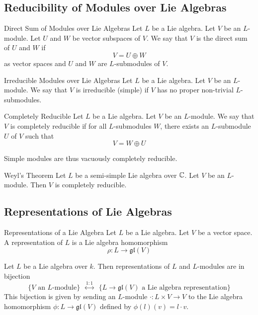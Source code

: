 \documentclass[a4paper]{article}
\begin{document}
\subsection{Reducibility of Modules over Lie Algebras}
\begin{defn}{Direct Sum of Modules over Lie Algebras}{} Let $L$ be a Lie algebra. Let $V$ be an $L$-module. Let $U$ and $W$ be vector subspaces of $V$. We say that $V$ is the direct sum of $U$ and $W$ if $$V=U\oplus W$$ as vector spaces and $U$ and $W$ are $L$-submodules of $V$. 
\end{defn}

\begin{defn}{Irreducible Modules over Lie Algebras}{} Let $L$ be a Lie algebra. Let $V$ be an $L$-module. We say that $V$ is irreducible (simple) if $V$ has no proper non-trivial $L$-submodules. 
\end{defn}

\begin{defn}{Completely Reducible}{} Let $L$ be a Lie algebra. Let $V$ be an $L$-module. We say that $V$ is completely reducible if for all $L$-submodules $W$, there exists an $L$-submodule $U$ of $V$ such that $$V=W\oplus U$$
\end{defn}

Simple modules are thus vacuously completely reducible. 

\begin{thm}{Weyl's Theorem}{} Let $L$ be a semi-simple Lie algebra over $\mathbb{C}$. Let $V$ be an $L$-module. Then $V$ is completely reducible. 
\end{thm}

\subsection{Representations of Lie Algebras}
\begin{defn}{Representations of a Lie Algebra}{} Let $L$ be a Lie algebra. Let $V$ be a vector space. A representation of $L$ is a Lie algebra homomorphism $$\rho:L\to\mathfrak{gl}(V)$$
\end{defn}

\begin{prp}{}{} Let $L$ be a Lie algebra over $k$. Then representations of $L$ and $L$-modules are in bijection $$\{V\text{ an }L\text{-module}\}\;\;\overset{1:1}{\leftrightarrow}\;\;\{L\to\mathfrak{gl}(V)\text{ a Lie algebra representation}\}$$ This bijection is given by sending an $L$-module $\cdot:L\times V\to V$ to the Lie algebra homomorphism $\phi:L\to\mathfrak{gl}(V)$ defined by $\phi(l)(v)=l\cdot v$. 
\end{prp}
\end{document}
